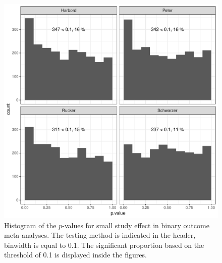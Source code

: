 \documentclass[11pt,a4paper,twoside]{book}\usepackage[]{graphicx}\usepackage[]{color}
\makeatletter
\def\maxwidth{ %
  \ifdim\Gin@nat@width>\linewidth
    \linewidth
  \else
    \Gin@nat@width
  \fi
}
\newenvironment{knitrout}{}{} %
\makeatother
\begin{document}
\begin{figure}[!ht]
\begin{knitrout}
\color{fgcolor}
\includegraphics[width=\maxwidth]{figure/unnamed-chunk-13-1} 

\end{knitrout}
\caption{Histogram of the $p$-values for small study effect in binary outcome meta-analyses. The testing method is indicated in the header, binwidth is equal to 0.1. The significant proportion based on the threshold of 0.1 is displayed inside the figures.}
\label{fig:test.bin}
\end{figure}
\end{document}

